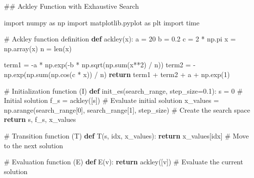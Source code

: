 \documentclass[
  letterpaper,
  DIV=11,
  numbers=noendperiod]{scrreprt}
\newenvironment{Shaded}{\begin{snugshade}}{\end{snugshade}}
\newcommand{\BuiltInTok}[1]{\textcolor[rgb]{0.00,0.23,0.31}{#1}}
\newcommand{\CommentTok}[1]{\textcolor[rgb]{0.37,0.37,0.37}{#1}}
\newcommand{\ControlFlowTok}[1]{\textcolor[rgb]{0.00,0.23,0.31}{\textbf{#1}}}
\newcommand{\DecValTok}[1]{\textcolor[rgb]{0.68,0.00,0.00}{#1}}
\newcommand{\FloatTok}[1]{\textcolor[rgb]{0.68,0.00,0.00}{#1}}
\newcommand{\ImportTok}[1]{\textcolor[rgb]{0.00,0.46,0.62}{#1}}
\newcommand{\KeywordTok}[1]{\textcolor[rgb]{0.00,0.23,0.31}{\textbf{#1}}}
\newcommand{\NormalTok}[1]{\textcolor[rgb]{0.00,0.23,0.31}{#1}}
\newcommand{\OperatorTok}[1]{\textcolor[rgb]{0.37,0.37,0.37}{#1}}
\begin{document}
\begin{Shaded}
\begin{Highlighting}[]
\CommentTok{\#\# Ackley Function with Exhaustive Search}

\ImportTok{import}\NormalTok{ numpy }\ImportTok{as}\NormalTok{ np}
\ImportTok{import}\NormalTok{ matplotlib.pyplot }\ImportTok{as}\NormalTok{ plt}
\ImportTok{import}\NormalTok{ time}

\CommentTok{\# Ackley function definition}
\KeywordTok{def}\NormalTok{ ackley(x):}
\NormalTok{    a }\OperatorTok{=} \DecValTok{20}
\NormalTok{    b }\OperatorTok{=} \FloatTok{0.2}
\NormalTok{    c }\OperatorTok{=} \DecValTok{2} \OperatorTok{*}\NormalTok{ np.pi}
\NormalTok{    x }\OperatorTok{=}\NormalTok{ np.array(x)  }
\NormalTok{    n }\OperatorTok{=} \BuiltInTok{len}\NormalTok{(x)}

\NormalTok{    term1 }\OperatorTok{=} \OperatorTok{{-}}\NormalTok{a }\OperatorTok{*}\NormalTok{ np.exp(}\OperatorTok{{-}}\NormalTok{b }\OperatorTok{*}\NormalTok{ np.sqrt(np.}\BuiltInTok{sum}\NormalTok{(x}\OperatorTok{**}\DecValTok{2}\NormalTok{) }\OperatorTok{/}\NormalTok{ n))}
\NormalTok{    term2 }\OperatorTok{=} \OperatorTok{{-}}\NormalTok{np.exp(np.}\BuiltInTok{sum}\NormalTok{(np.cos(c }\OperatorTok{*}\NormalTok{ x)) }\OperatorTok{/}\NormalTok{ n)}
    \ControlFlowTok{return}\NormalTok{ term1 }\OperatorTok{+}\NormalTok{ term2 }\OperatorTok{+}\NormalTok{ a }\OperatorTok{+}\NormalTok{ np.exp(}\DecValTok{1}\NormalTok{)}

\CommentTok{\# Initialization function (I)}
\KeywordTok{def}\NormalTok{ init\_es(search\_range, step\_size}\OperatorTok{=}\FloatTok{0.1}\NormalTok{):}
\NormalTok{    s }\OperatorTok{=} \DecValTok{0}  \CommentTok{\# Initial solution}
\NormalTok{    f\_s }\OperatorTok{=}\NormalTok{ ackley([s])  }\CommentTok{\# Evaluate initial solution}
\NormalTok{    x\_values }\OperatorTok{=}\NormalTok{ np.arange(search\_range[}\DecValTok{0}\NormalTok{], search\_range[}\DecValTok{1}\NormalTok{], step\_size)  }\CommentTok{\# Create the search space}
    \ControlFlowTok{return}\NormalTok{ s, f\_s, x\_values}

\CommentTok{\# Transition function (T)}
\KeywordTok{def}\NormalTok{ T(s, idx, x\_values):}
    \ControlFlowTok{return}\NormalTok{ x\_values[idx]  }\CommentTok{\# Move to the next solution}

\CommentTok{\# Evaluation function (E)}
\KeywordTok{def}\NormalTok{ E(v):}
    \ControlFlowTok{return}\NormalTok{ ackley([v])  }\CommentTok{\# Evaluate the current solution}


\end{Highlighting}
\end{Shaded}
\end{document}
